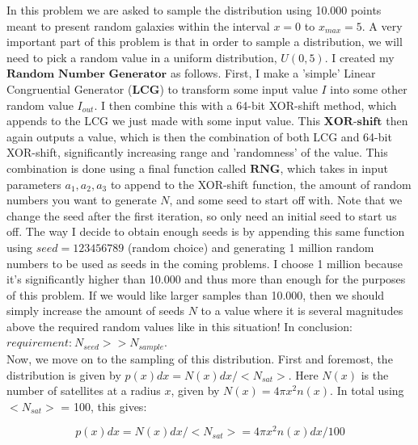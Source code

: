 In this problem we are asked to sample the distribution using 10.000 points meant to present random galaxies within the interval $x= 0$ to $x_{max} = 5$. A very important part of this problem is that in order to sample a distribution, we will need to pick a random value in a uniform distribution, $U(0,5)$. I created my $\textbf{Random Number Generator}$ as follows. First, I make a 'simple' Linear Congruential Generator ($\textbf{LCG}$) to transform some input value $I$ into some other random value $I_{out}$. I then combine this with a 64-bit XOR-shift method, which appends to the LCG we just made with some input value. This $\textbf{XOR-shift}$ then again outputs a value, which is then the combination of both LCG and 64-bit XOR-shift, significantly increasing range and 'randomness' of the value. This combination is done using a final function called $\textbf{RNG}$, which takes in input parameters $a_1,a_2,a_3$ to append to the XOR-shift function, the amount of random numbers you want to generate $N$, and some seed to start off with. Note that we change the seed after the first iteration, so only need an initial seed to start us off. The way I decide to obtain enough seeds is by appending this same function using $seed = 123456789$ (random choice) and generating 1 million random numbers to be used as seeds in the coming problems. I choose 1 million because it's significantly higher than 10.000 and thus more than enough for the purposes of this problem. If we would like larger samples than 10.000, then we should simply increase the amount of seeds $N$ to a value where it is several magnitudes above the required random values like in this situation! In conclusion: $\textit{requirement:} \ N_{seed} >> N_{sample}$.\\

Now, we move on to the sampling of this distribution. First and foremost, the distribution is given by $p(x) dx = N(x) dx / <N_{sat}>$. Here $N(x)$ is the number of satellites at a radius $x$, given by $N(x) = 4\pi x^2 n(x)$. In total using $<N_{sat}>$ = 100, this gives: 

\begin{equation}
	p(x) dx = N(x) dx /<N_{sat}> = 4\pi x^2 n(x) dx/100
\end{equation}

